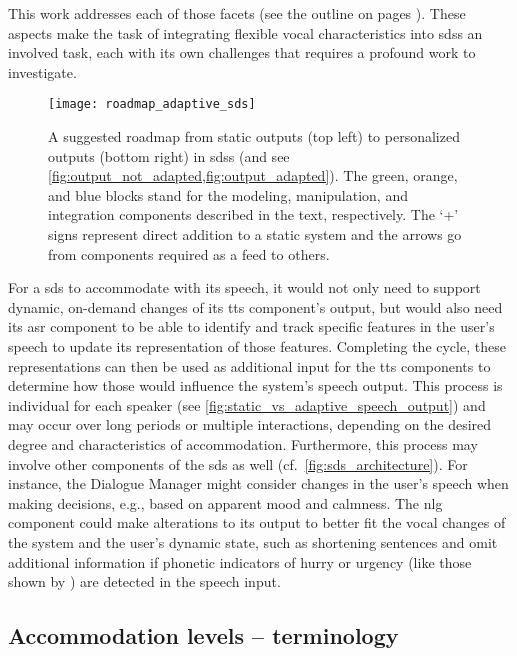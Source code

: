 This work addresses each of those facets (see the outline on pages ).
These aspects make the task of integrating flexible vocal characteristics into \acp{sds} an involved task, each with its own challenges that requires a profound work to investigate.
%
\begin{figure}[t]
	\centering
	\texttt{[image: roadmap\_adaptive\_sds]}
	\caption[Roadmap to phonetically adaptive \acl{sds}]
		{A suggested roadmap from static outputs (top left) to personalized outputs (bottom right) in \acp{sds} (and see \cref{fig:output_not_adapted,fig:output_adapted}).
		The green, orange, and blue blocks stand for the modeling, manipulation, and integration components described in the text, respectively.
		The \enquote*{+} signs represent direct addition to a static system and the arrows go from components required as a feed to others.}
	\label{fig:roadmap_adaptive_sds}
\end{figure}
%
For a \ac{sds} to accommodate with its speech, it would not only need to support dynamic, on-demand changes of its \ac{tts} component's output, but would also need its \ac{asr} component to be able to identify and track specific features in the user's speech to update its representation of those features.
Completing the cycle, these representations can then be used as additional input for the \ac{tts} components to determine how those would influence the system's speech output.
This process is individual for each speaker (see \cref{fig:static_vs_adaptive_speech_output}) and may occur over long periods or multiple interactions, depending on the desired degree and characteristics of accommodation.
Furthermore, this process may involve other components of the \ac{sds} as well (cf.\ \cref{fig:sds_architecture}).
For instance, the Dialogue Manager might consider changes in the user's speech when making decisions, e.g., based on apparent mood and calmness.
The \ac{nlg} component could make alterations to its output to better fit the vocal changes of the system and the user's dynamic state, such as shortening sentences and omit additional information if phonetic indicators of hurry or urgency (like those shown by \citet{Edworthy2003acoustic}) are detected in the speech input.

\subsection{Accommodation levels -- terminology}
\label{subsec:accommodation_levels}

